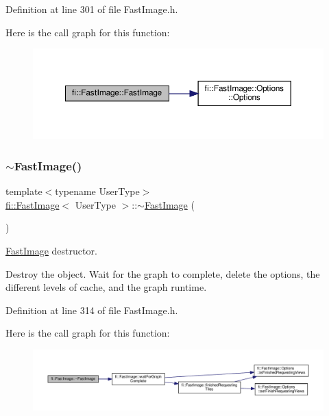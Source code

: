 Definition at line 301 of file Fast\+Image.\+h.

Here is the call graph for this function\+:
\nopagebreak
\begin{figure}[H]
\begin{center}
\leavevmode
\includegraphics[width=350pt]{dc/d6b/classfi_1_1FastImage_a0db8d5c797b4e6d13b09655d272ae22c_cgraph}
\end{center}
\end{figure}
\mbox{\label{classfi_1_1FastImage_a694492eb7802678db82993d8d087604b}} 
\subsubsection{\texorpdfstring{$\sim$\+Fast\+Image()}{~FastImage()}}
{\footnotesize\ttfamily template$<$typename User\+Type$>$ \\
\hyperlink{classfi_1_1FastImage}{fi\+::\+Fast\+Image}$<$ User\+Type $>$\+::$\sim$\hyperlink{classfi_1_1FastImage}{Fast\+Image} (\begin{DoxyParamCaption}{ }\end{DoxyParamCaption})\hspace{0.3cm}{\ttfamily [inline]}}



\hyperlink{classfi_1_1FastImage}{Fast\+Image} destructor. 

Destroy the object. Wait for the graph to complete, delete the options, the different levels of cache, and the graph runtime. 

Definition at line 314 of file Fast\+Image.\+h.

Here is the call graph for this function\+:
\nopagebreak
\begin{figure}[H]
\begin{center}
\leavevmode
\includegraphics[width=350pt]{dc/d6b/classfi_1_1FastImage_a694492eb7802678db82993d8d087604b_cgraph}
\end{center}
\end{figure}


